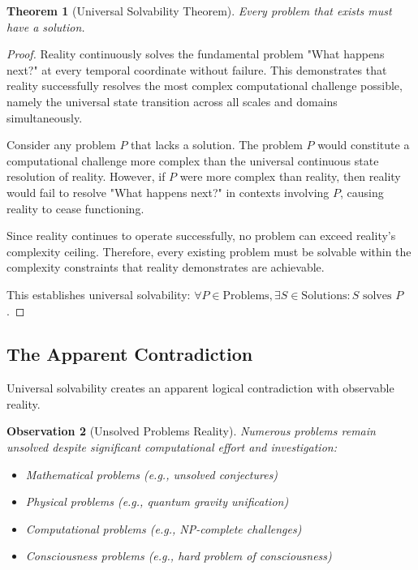 \documentclass[12pt,a4paper]{article}
\newtheorem{theorem}{Theorem}[section]
\newtheorem{observation}[theorem]{Observation}
\begin{document}
\begin{theorem}[Universal Solvability Theorem]
Every problem that exists must have a solution.
\end{theorem}

\begin{proof}
Reality continuously solves the fundamental problem "What happens next?" at every temporal coordinate without failure. This demonstrates that reality successfully resolves the most complex computational challenge possible, namely the universal state transition across all scales and domains simultaneously.

Consider any problem $P$ that lacks a solution. The problem $P$ would constitute a computational challenge more complex than the universal continuous state resolution of reality. However, if $P$ were more complex than reality, then reality would fail to resolve "What happens next?" in contexts involving $P$, causing reality to cease functioning.

Since reality continues to operate successfully, no problem can exceed reality's complexity ceiling. Therefore, every existing problem must be solvable within the complexity constraints that reality demonstrates are achievable.

This establishes universal solvability: $\forall P \in \text{Problems}, \exists S \in \text{Solutions} : S \text{ solves } P$.
\end{proof}

\subsection{The Apparent Contradiction}

Universal solvability creates an apparent logical contradiction with observable reality.

\begin{observation}[Unsolved Problems Reality]
Numerous problems remain unsolved despite significant computational effort and investigation:
\begin{itemize}
\item Mathematical problems (e.g., unsolved conjectures)
\item Physical problems (e.g., quantum gravity unification)
\item Computational problems (e.g., NP-complete challenges)
\item Consciousness problems (e.g., hard problem of consciousness)
\end{itemize}
\end{observation}
\end{document}
